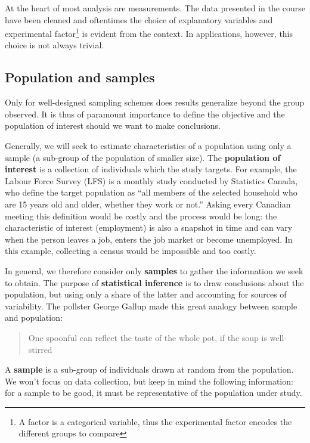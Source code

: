\documentclass[
  11pt,
  letterpaper,
]{scrbook}
\theoremstyle{definition}
\theoremstyle{definition}
\theoremstyle{remark}
\begin{document}
At the heart of most analysis are measurements. The data presented in
the course have been cleaned and oftentimes the choice of explanatory
variables and experimental factor\footnote{A factor is a categorical
  variable, thus the experimental factor encodes the different groups to
  compare} is evident from the context. In applications, however, this
choice is not always trivial.

\subsection{Population and samples}\label{population-sample}

Only for well-designed sampling schemes does results generalize beyond
the group observed. It is thus of paramount importance to define the
objective and the population of interest should we want to make
conclusions.

Generally, we will seek to estimate characteristics of a population
using only a sample (a sub-group of the population of smaller size). The
\textbf{population of interest} is a collection of individuals which the
study targets. For example, the Labour Force Survey (LFS) is a monthly
study conducted by Statistics Canada, who define the target population
as ``all members of the selected household who are 15 years old and
older, whether they work or not.'' Asking every Canadian meeting this
definition would be costly and the process would be long: the
characteristic of interest (employment) is also a snapshot in time and
can vary when the person leaves a job, enters the job market or become
unemployed. In this example, collecting a census would be impossible and
too costly.

In general, we therefore consider only \textbf{samples} to gather the
information we seek to obtain. The purpose of \textbf{statistical
inference} is to draw conclusions about the population, but using only a
share of the latter and accounting for sources of variability. The
pollster George Gallup made this great analogy between sample and
population:

\begin{quote}
One spoonful can reflect the taste of the whole pot, if the soup is
well-stirred
\end{quote}

A \textbf{sample} is a sub-group of individuals drawn at random from the
population. We won't focus on data collection, but keep in mind the
following information: for a sample to be good, it must be
representative of the population under study.
\end{document}
